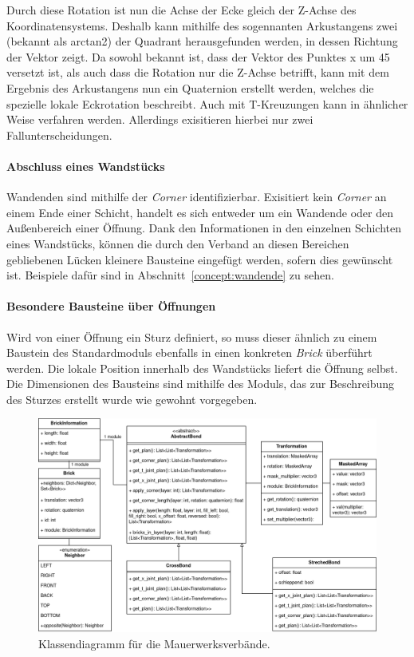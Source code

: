 Durch diese Rotation ist nun die Achse der Ecke gleich der Z-Achse des Koordinatensystems.
Deshalb kann mithilfe des sogennanten \glqq{}Arkustangens zwei\grqq{} (bekannt als arctan2) der Quadrant herausgefunden werden, in dessen Richtung der Vektor zeigt.
Da sowohl bekannt ist, dass der Vektor des Punktes x um 45\degree{} versetzt ist, als auch dass die Rotation nur die Z-Achse betrifft, kann mit dem Ergebnis des Arkustangens nun ein Quaternion erstellt werden, welches die spezielle lokale Eckrotation beschreibt.
Auch mit T-Kreuzungen kann in ähnlicher Weise verfahren werden. 
Allerdings exisitieren hierbei nur zwei Fallunterscheidungen.

\paragraph*{Abschluss eines Wandstücks} Wandenden sind mithilfe der \textit{Corner} identifizierbar.
Exisitiert kein \textit{Corner} an einem Ende einer Schicht, handelt es sich entweder um ein Wandende oder den Außenbereich einer Öffnung.
Dank den Informationen in den einzelnen Schichten eines Wandstücks, können die durch den Verband an diesen Bereichen gebliebenen Lücken kleinere Bausteine eingefügt werden, sofern dies gewünscht ist.
Beispiele dafür sind in Abschnitt~\ref{concept:wandende} zu sehen.

\paragraph*{Besondere Bausteine über Öffnungen} Wird von einer Öffnung ein Sturz definiert, so muss dieser ähnlich zu einem Baustein des Standardmoduls ebenfalls in einen konkreten \textit{Brick} überführt werden.
Die lokale Position innerhalb des Wandstücks liefert die Öffnung selbst.
Die Dimensionen des Bausteins sind mithilfe des Moduls, das zur Beschreibung des Sturzes erstellt wurde wie gewohnt vorgegeben.

\begin{figure}[hb]
  \centering
  \includegraphics[width=0.9\columnwidth]{fig/klassendiagramm_bonds.drawio.png}
  \caption{Klassendiagramm für die Mauerwerksverbände.}
  \label{fig:real:class_diagram_bonds}
\end{figure}

